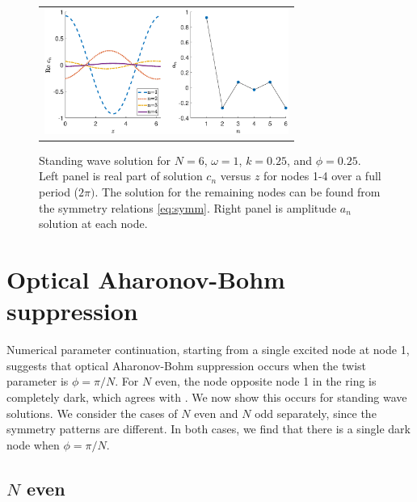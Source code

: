 \documentclass[reprint, amsmath,amssymb,aps]{revtex4-2}
\begin{document}
\begin{figure}
\begin{center}
\begin{tabular}{c}
\includegraphics[width=8cm]{twist025.eps}
\end{tabular}
\end{center}
\caption{Standing wave solution for $N = 6$, $\omega = 1$, $k = 0.25$, and $\phi = 0.25$. Left panel is real part of solution $c_n$ versus $z$ for nodes 1-4 over a full period ($2 \pi)$. The solution for the remaining nodes can be found from the symmetry relations \cref{eq:symm}. Right panel is amplitude $a_n$ solution at each node.}
\label{fig:twist025}
\end{figure}

\section{Optical Aharonov-Bohm suppression}\label{sec:ABsupp}

Numerical parameter continuation, starting from a single excited node at node 1, suggests that optical Aharonov-Bohm suppression occurs when the twist parameter is $\phi = \pi/N$. For $N$ even, the node opposite node 1 in the ring is completely dark, which agrees with \cite{castro2016,Parto2017}. We now show this occurs for standing wave solutions. We consider the cases of $N$ even and $N$ odd separately, since the symmetry patterns are different. In both cases, we find that there is a single dark node when $\phi = \pi/N$.

\subsection{\texorpdfstring{$N$}{N} even}\label{sec:Neven}
\end{document}
